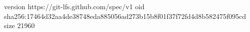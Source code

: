 version https://git-lfs.github.com/spec/v1
oid sha256:17464d32aa4de38748eda885056ad273b15b8f01f37f72fd4d8b582475f095cd
size 21960
